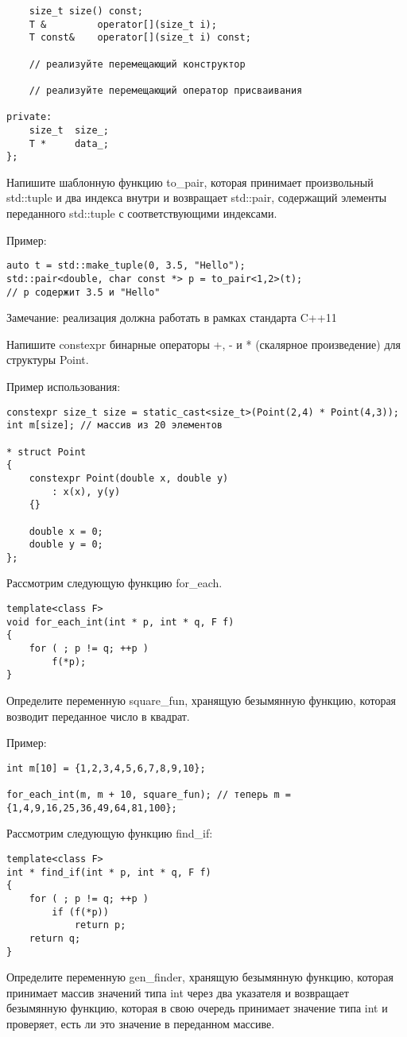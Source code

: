 \documentclass[]{article}
\begin{document}
\begin{enumerate}
\begin{verbatim}
    size_t size() const;
    T &         operator[](size_t i);
    T const&    operator[](size_t i) const;

    // реализуйте перемещающий конструктор

    // реализуйте перемещающий оператор присваивания

private:    
    size_t  size_;
    T *     data_;    
};

\end{verbatim}
Напишите шаблонную функцию to\_pair, которая принимает произвольный std::tuple и два индекса внутри и возвращает std::pair, содержащий элементы переданного std::tuple с соответствующими индексами.

Пример:
\begin{verbatim}
auto t = std::make_tuple(0, 3.5, "Hello");
std::pair<double, char const *> p = to_pair<1,2>(t); 
// p содержит 3.5 и "Hello"
\end{verbatim}

Замечание: реализация должна работать в рамках стандарта C++11

Напишите constexpr бинарные операторы +, - и * (скалярное произведение) для структуры Point.

Пример использования:
\begin{verbatim}
constexpr size_t size = static_cast<size_t>(Point(2,4) * Point(4,3));
int m[size]; // массив из 20 элементов

* struct Point
{
    constexpr Point(double x, double y) 
        : x(x), y(y) 
    {}

    double x = 0;
    double y = 0;
};

\end{verbatim}

Рассмотрим следующую функцию for\_each.
\begin{verbatim}
template<class F>
void for_each_int(int * p, int * q, F f)
{
    for ( ; p != q; ++p )
        f(*p);
}
\end{verbatim}
Определите переменную square\_fun, хранящую безымянную функцию, которая возводит переданное число в квадрат.

Пример:
\begin{verbatim}
int m[10] = {1,2,3,4,5,6,7,8,9,10};

for_each_int(m, m + 10, square_fun); // теперь m = {1,4,9,16,25,36,49,64,81,100};
\end{verbatim}
Рассмотрим следующую функцию find\_if:
\begin{verbatim}
template<class F>
int * find_if(int * p, int * q, F f)
{
    for ( ; p != q; ++p )
        if (f(*p))
            return p;
    return q;
}
\end{verbatim}
Определите переменную gen\_finder, хранящую безымянную функцию, которая принимает массив значений типа int через два указателя и возвращает безымянную функцию, которая в свою очередь принимает значение типа int и проверяет, есть ли это значение в переданном массиве.


\end{enumerate}
\end{document}
